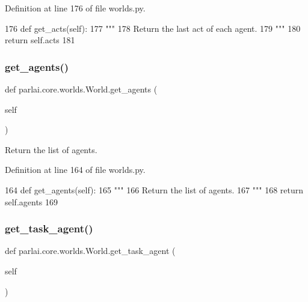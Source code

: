 Definition at line 176 of file worlds.\+py.


\begin{DoxyCode}
176     \textcolor{keyword}{def }get\_acts(self):
177         \textcolor{stringliteral}{"""}
178 \textcolor{stringliteral}{        Return the last act of each agent.}
179 \textcolor{stringliteral}{        """}
180         \textcolor{keywordflow}{return} self.acts
181 
\end{DoxyCode}
\mbox{\label{classparlai_1_1core_1_1worlds_1_1World_a1c74e607d064c5823e56b23b21ce17f0}} 
\subsubsection{\texorpdfstring{get\+\_\+agents()}{get\_agents()}}
{\footnotesize\ttfamily def parlai.\+core.\+worlds.\+World.\+get\+\_\+agents (\begin{DoxyParamCaption}\item[{}]{self }\end{DoxyParamCaption})}

\begin{DoxyVerb}Return the list of agents.
\end{DoxyVerb}
 

Definition at line 164 of file worlds.\+py.


\begin{DoxyCode}
164     \textcolor{keyword}{def }get\_agents(self):
165         \textcolor{stringliteral}{"""}
166 \textcolor{stringliteral}{        Return the list of agents.}
167 \textcolor{stringliteral}{        """}
168         \textcolor{keywordflow}{return} self.agents
169 
\end{DoxyCode}
\mbox{\label{classparlai_1_1core_1_1worlds_1_1World_a25ccd7740aa992bb7055bf6549574a07}} 
\subsubsection{\texorpdfstring{get\+\_\+task\+\_\+agent()}{get\_task\_agent()}}
{\footnotesize\ttfamily def parlai.\+core.\+worlds.\+World.\+get\+\_\+task\+\_\+agent (\begin{DoxyParamCaption}\item[{}]{self }\end{DoxyParamCaption})}

